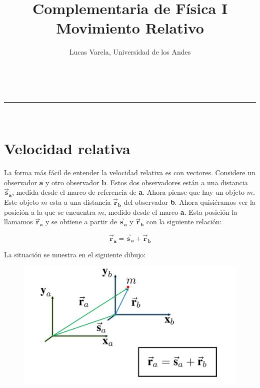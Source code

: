 \documentclass[a4paper,11pt]{article}
\makeatletter
\newcommand{\linia}{\rule{\linewidth}{0.5pt}}
\theoremstyle{mytheor}
\renewcommand{\maketitle}{
\begin{center}
\vspace{2ex}
{\huge \textsc{\@title}}
\vspace{1ex}
\\
\linia\\
\@author \hfill \@date
\vspace{4ex}
\end{center}
}
\makeatother
\begin{document}
\title{Complementaria de Física I \\ Movimiento Relativo}

\author{Lucas Varela, Universidad de los Andes}


\date{}
\maketitle

\section{Velocidad relativa}

La forma más fácil de entender la velocidad relativa es con vectores. Considere un observador \textbf{a} y otro observador \textbf{b}. Estos dos observadores están a una distancia $\vec{\textbf{s}}_{\textbf{a}}$, medida desde el marco de referencia de \textbf{a}. Ahora piense que hay un objeto $m$. Este objeto $m$ esta a una distancia $\vec{\textbf{r}}_{\textbf{b}}$ del observador \textbf{b}. Ahora quisiéramos ver la posición a la que se encuentra $m$, medido desde el marco \textbf{a}. Esta posición la llamamos $\vec{\textbf{r}}_{\textbf{a}}$ y se obtiene a partir de $\vec{\textbf{s}}_{\textbf{a}}$ y $\vec{\textbf{r}}_{\textbf{b}}$ con la siguiente relación:


\begin{equation}\label{1}
\vec{\textbf{r}}_{\textbf{a}} = \vec{\textbf{s}}_{\textbf{a}} + \vec{\textbf{r}}_{\textbf{b}}
\end{equation}


La situación se muestra en el siguiente dibujo:

\begin{figure}[h]
		\includegraphics[width=.9\linewidth]{./im/mvtorela}
		\label{fcN4}
\end{figure}
\end{document}
